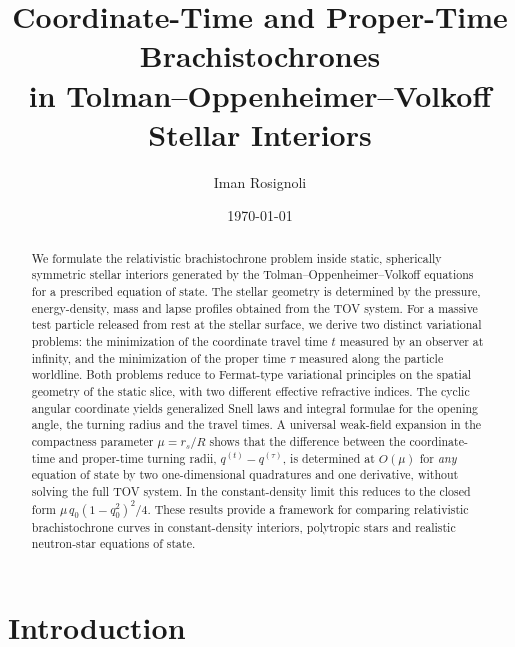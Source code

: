 \documentclass[
  aps,
  prd,
  twocolumn,
  nofootinbib,
  superscriptaddress,
  longbibliography
]{revtex4-2}
\begin{document}
\title{Coordinate-Time and Proper-Time Brachistochrones\\
in Tolman--Oppenheimer--Volkoff Stellar Interiors}

\author{Iman Rosignoli}

\date{\today}

\begin{abstract}
We formulate the relativistic brachistochrone problem inside static,
spherically symmetric stellar interiors generated by the
Tolman--Oppenheimer--Volkoff equations for a prescribed equation of
state. The stellar geometry is determined by the pressure,
energy-density, mass and lapse profiles obtained from the TOV system.
For a massive test particle released from rest at the stellar surface,
we derive two distinct variational problems: the minimization of the
coordinate travel time $t$ measured by an observer at infinity, and the
minimization of the proper time $\tau$ measured along the particle
worldline. Both problems reduce to Fermat-type variational principles
on the spatial geometry of the static slice, with two different
effective refractive indices. The cyclic angular coordinate yields generalized Snell laws and
integral formulae for the opening angle, the turning radius and the
travel times. A universal weak-field expansion in the compactness
parameter $\mu=r_s/R$ shows that the difference between the
coordinate-time and proper-time turning radii,
$q^{(t)}-q^{(\tau)}$, is determined at $O(\mu)$ for \emph{any}
equation of state by two one-dimensional quadratures and one
derivative, without solving the full TOV system. In the
constant-density limit this reduces to the closed form
$\mu\,q_0(1-q_0^2)^2/4$. These results provide a framework for
comparing relativistic brachistochrone curves in constant-density
interiors, polytropic stars and realistic neutron-star equations of
state.
\end{abstract}

\maketitle

\section{Introduction}
\end{document}
